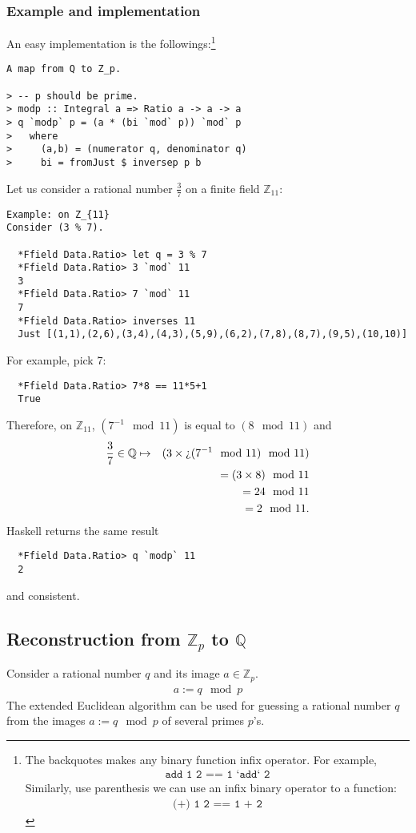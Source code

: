 \documentclass[11pt]{book}
\begin{document}
\subsubsection{Example and implementation}
An easy implementation is the followings:\footnote{
The backquotes makes any binary function infix operator.
For example,
\begin{eqnarray}
\texttt{add 1 2 == 1 `add` 2}
\end{eqnarray}
Similarly, use parenthesis we can use an infix binary operator to a function:
\begin{eqnarray}
\texttt{(+) 1 2 == 1 + 2}
\end{eqnarray}
}
\begin{verbatim}
A map from Q to Z_p.

> -- p should be prime.
> modp :: Integral a => Ratio a -> a -> a
> q `modp` p = (a * (bi `mod` p)) `mod` p
>   where
>     (a,b) = (numerator q, denominator q)
>     bi = fromJust $ inversep p b
\end{verbatim}
Let us consider a rational number $\frac{3}{7}$ on a finite field $\mathbb{Z}_{11}$:
\begin{verbatim}
Example: on Z_{11}
Consider (3 % 7).

  *Ffield Data.Ratio> let q = 3 % 7
  *Ffield Data.Ratio> 3 `mod` 11
  3
  *Ffield Data.Ratio> 7 `mod` 11
  7
  *Ffield Data.Ratio> inverses 11
  Just [(1,1),(2,6),(3,4),(4,3),(5,9),(6,2),(7,8),(8,7),(9,5),(10,10)]
\end{verbatim}
For example, pick 7:
\begin{verbatim}  
  *Ffield Data.Ratio> 7*8 == 11*5+1
  True
\end{verbatim}
Therefore, on $\mathbb{Z}_{11}$, $(7^{-1} \mod 11)$ is equal to $(8 \mod 11)$ and
\begin{eqnarray}
\frac{3}{7} \in \mathbb{Q} &\mapsto& (3 \times \text{\textquestiondown}(7^{-1} \mod 11) \mod 11) \\
&&= (3 \times 8) \mod 11 \\
&&= 24 \mod 11 \\
&&= 2 \mod 11.
\end{eqnarray}
Haskell returns the same result
\begin{verbatim}  
  *Ffield Data.Ratio> q `modp` 11
  2
\end{verbatim}
and consistent.

\subsection{Reconstruction from $\mathbb{Z}_p$ to $\mathbb{Q}$}
Consider a rational number $q$ and its image $a \in \mathbb{Z}_p$.
\begin{eqnarray}
a := q \mod p
\end{eqnarray}
The extended Euclidean algorithm can be used for guessing a rational number $q$ from the images $a := q \mod p$ of several primes $p$'s.
\end{document}
